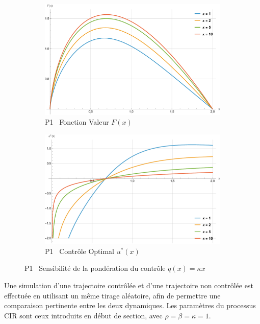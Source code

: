 \FloatBarrier\begin{figure}[htb]
    \centering
    \begin{subfigure}{0.49\linewidth}
        \includegraphics[width=\linewidth]{img/validation/P1/p1_K_value.pdf}
        \caption{P1 \textemdash~Fonction Valeur $F(x)$}\label{fig:KappaValueVisualisation1}
    \end{subfigure}
    \hfill
    \begin{subfigure}{0.49\linewidth}
        \includegraphics[width=\linewidth]{img/validation/P1/p1_K_control.pdf}
        \caption{P1 \textemdash~Contrôle Optimal $u^*(x)$}\label{fig:KappaControlVisualisation1}
    \end{subfigure}
    \caption{P1 \textemdash~Sensibilité de la pondération du contrôle $q(x)=\kappa x$}\label{fig:KappaValueControlComparison1}
\end{figure}
\FloatBarrier Une simulation d'une trajectoire contrôlée et d'une trajectoire non contrôlée est effectuée en utilisant un même tirage aléatoire, afin de permettre une comparaison pertinente entre les deux dynamiques. Les paramètres du processus \acs{CIR} sont ceux introduits en début de section, avec $\rho = \beta = \kappa = 1$.
